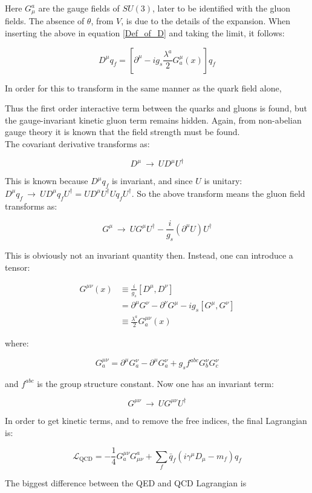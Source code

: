\documentclass[11pt,a4paper]{article}
\begin{document}
Here $G_\mu^a$ are the gauge fields of $SU(3)$, later to be identified with the gluon fields. The absence of $\theta$, from $V$, is due to the details of the expansion. When inserting the above in equation \ref{Def_of_D} and taking the limit, it follows:

\begin{equation}
	D^\mu q_f = \left[ \partial^\mu - ig_s\frac{\lambda^a}{2}G_a^\mu(x) \right]q_f
\end{equation}

In order for this to transform in the same manner as the quark field alone,

Thus the first order interactive term between the quarks and gluons is found, but the gauge-invariant kinetic gluon term remains hidden. Again, from non-abelian gauge theory it is known that the field strength must be found.\\
The covariant derivative transforms as:

\begin{equation}
	D^\mu \:\rightarrow\: UD^\mu U^\dagger
\end{equation}

This is known because $D^\mu q_f$ is invariant, and since $U$ is unitary:$D^\mu q_f \:\rightarrow\: UD^\mu q_fU^\dagger = UD^\mu U^\dagger U q_fU^\dagger$. So the above transform means the gluon field transforms as:

\begin{equation}
	G^\mu \:\rightarrow\: UG^\mu U^\dagger - \frac{i}{g_s}(\partial^\mu U)U^\dagger
\end{equation}

This is obviously not an invariant quantity then. Instead, one can introduce a tensor:

\begin{align*}
	G^{\mu\nu}(x) &\equiv \frac{i}{g_s}[D^\mu,D^\nu]\\
	&= \partial^\mu G^\nu - \partial^\nu G^\mu - ig_s[G^\mu,G^\nu]\\
	&\equiv \frac{\lambda^a}{2}G_a^{\mu\nu}(x)
\end{align*}

where:

\begin{equation}
	G_a^{\mu\nu} = \partial^\mu G_a^\nu - \partial^\mu G_a^\nu + g_sf^{abc}G_b^\nu G_c^\nu
\end{equation}

and $f^{abc}$ is the group structure constant. Now one has an invariant term:

\begin{equation}
	G^{\mu\nu} \:\rightarrow\: UG^{\mu\nu}U^\dagger
\end{equation}

In order to get kinetic terms, and to remove the free indices, the final Lagrangian is:

\begin{equation}
	\mathcal{L}_{\text{QCD}} = -\frac{1}{4}G_a^{\mu\nu}G_{\mu\nu}^a + \sum_f \bar{q}_f(i\gamma^\mu D_\mu - m_f)q_f
\end{equation}

The biggest difference between the QED and QCD Lagrangian is 
\end{document}
